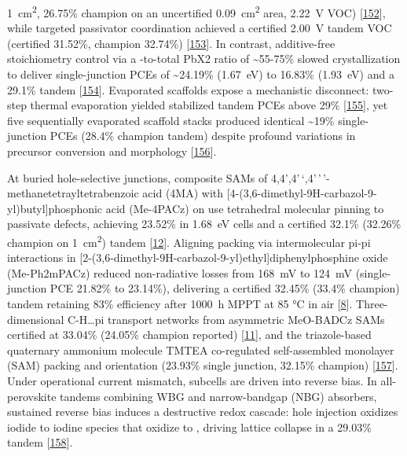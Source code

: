 \documentclass[
  11pt,
]{article}
\begin{document}
\qty{1}{\centi\meter\squared}, 26.75\% champion on an uncertified
\qty{0.09}{\centi\meter\squared} area, \qty{2.22}{\volt} VOC)
{[}\href{https://doi.org/10.1002/adma.72986}{152}{]}, while targeted
passivator coordination achieved a certified \qty{2.00}{\volt} tandem
VOC (certified 31.52\%, champion 32.74\%)
{[}\href{https://doi.org/10.1002/aenm.71077}{153}{]}. In contrast,
additive-free stoichiometry control via a -to-total PbX2 ratio
of \textasciitilde55-75\% slowed crystallization to deliver
single-junction PCEs of \textasciitilde24.19\%
(\qty{1.67}{\electronvolt}) to 16.83\% (\qty{1.93}{\electronvolt}) and a
29.1\% tandem {[}\href{https://doi.org/10.1021/acsnano.6c04740}{154}{]}.
Evaporated scaffolds expose a mechanistic disconnect: two-step thermal
evaporation yielded stabilized tandem PCEs above 29\%
{[}\href{https://doi.org/10.1021/acsenergylett.6c00156}{155}{]}, yet
five sequentially evaporated scaffold stacks produced identical
\textasciitilde19\% single-junction PCEs (28.4\% champion tandem)
despite profound variations in precursor conversion and morphology
{[}\href{https://doi.org/10.1021/acsami.6c07582}{156}{]}.

At buried hole-selective junctions, composite SAMs of
4,4',4'\,`,4'\,'\,'-methanetetrayltetrabenzoic acid (4MA) with
{[}4-(3,6-dimethyl-9H-carbazol-9-yl)butyl{]}phosphonic acid (Me-4PACz)
on  use tetrahedral molecular pinning to passivate defects,
achieving 23.52\% in \qty{1.68}{\electronvolt} cells and a certified
32.1\% (32.26\% champion on \qty{1}{\centi\meter\squared}) tandem
{[}\href{https://doi.org/10.1002/anie.5162616}{12}{]}. Aligning packing
via intermolecular pi-pi interactions in
{[}2-(3,6-dimethyl-9H-carbazol-9-yl)ethyl{]}diphenylphosphine oxide
(Me-Ph2mPACz) reduced non-radiative losses from \qty{168}{\milli\volt}
to \qty{124}{\milli\volt} (single-junction PCE 21.82\% to 23.14\%),
delivering a certified 32.45\% (33.4\% champion) tandem retaining 83\%
efficiency after \qty{1000}{\hour} MPPT at 85 °C in air
{[}\href{https://doi.org/10.1038/s41467-026-72160-x}{8}{]}.
Three-dimensional C-H\ldots pi transport networks from asymmetric
MeO-BADCz SAMs certified at 33.04\% (24.05\% champion reported)
{[}\href{https://doi.org/10.1038/s41467-026-73656-2}{11}{]}, and the
triazole-based quaternary ammonium molecule TMTEA co-regulated
self-assembled monolayer (SAM) packing and orientation (23.93\% single
junction, 32.15\% champion)
{[}\href{https://doi.org/10.1021/acsenergylett.6c00166}{157}{]}. Under
operational current mismatch, subcells are driven into reverse bias. In
all-perovskite tandems combining WBG and narrow-bandgap (NBG) absorbers,
sustained reverse bias induces a destructive redox cascade: hole
injection oxidizes iodide to iodine species that oxidize  to
, driving lattice collapse in a 29.03\% tandem
{[}\href{https://doi.org/10.1002/adma.202522942}{158}{]}.
\end{document}
